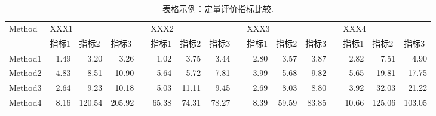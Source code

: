 \begin{table}[htb!]
	\centering
	\setlength{\tabcolsep}{2pt}
	\scriptsize
	\caption{表格示例：定量评价指标比较.}
	\begin{tabular}{lrrrrrrrrrrrrrrr}
		\toprule
		Method & \multicolumn{3}{l}{XXX1} & & \multicolumn{3}{l}{XXX2} & & \multicolumn{3}{l}{XXX3} & & \multicolumn{3}{l}{XXX4} \\ 
		\cmidrule{2-4} \cmidrule{6-8} \cmidrule{10-12} \cmidrule{14-16}
		& \multicolumn{1}{l}{指标1} & \multicolumn{1}{l}{指标2} & \multicolumn{1}{l}{指标3} &           & \multicolumn{1}{l}{指标1} & \multicolumn{1}{l}{指标2} & \multicolumn{1}{l}{指标3} &           & \multicolumn{1}{l}{指标1} & \multicolumn{1}{l}{指标2} & \multicolumn{1}{l}{指标3} &           & \multicolumn{1}{l}{指标1} & \multicolumn{1}{l}{指标2} & \multicolumn{1}{l}{指标3} \\
		\midrule          
		Method1 & 1.49                        & 3.20                        & 3.26                        &           & 1.02                        & 3.75                        & 3.44                        &           & 2.80                        & 3.57                        & 3.87                        &           & 2.82                        & 7.51                        & 4.90                        \\
		Method2 & 4.83                        & 8.51                        & 10.90                       &           & 5.64                        & 5.72                        & 7.81                        &           & 3.99                        & 5.68                        & 9.82                        &           & 5.65                        & 19.81                       & 17.75                       \\
		Method3 & 2.64                        & 9.23                        & 10.18                       &           & 5.03                        & 11.11                       & 9.45                        &           & 2.69                        & 8.03                        & 8.80                        &           & 3.92                        & 32.03                       & 21.22                       \\
		Method4 & 8.16                        & 120.54                      & 205.92                      &           & 65.38                       & 74.31                       & 78.27                       &           & 8.39                        & 59.59                       & 83.85                       &           & 10.66                       & 125.06                      & 103.05                      \\

\end{tabular}
\end{table}

